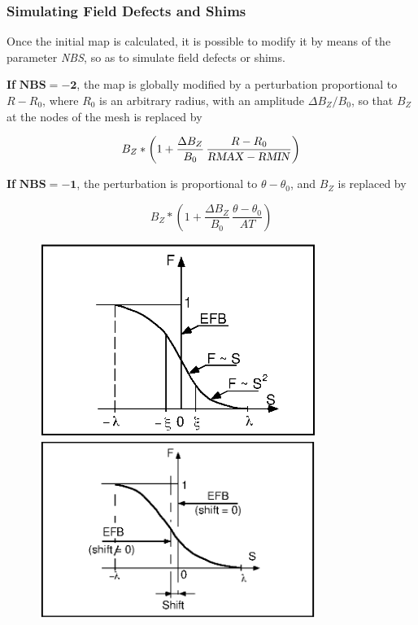  
 \subsubsection*{Simulating Field Defects and Shims } 
 
  Once the initial map is calculated, it is possible to modify it by
means of the parameter \textsl{NBS}, so as to simulate field defects or shims. 
\bigskip

\noindent\textbf{If} $\mathbf{NBS = -2}$, the map is globally modified by a
perturbation proportional to $ R-R_0 $, where $ R_0 $ is an arbitrary radius, 
with an amplitude $ \Delta B_Z/B_0 $, so that $ B_Z $ at the nodes of the mesh is replaced by 

$$ B_Z \ast  \left( 1+ \frac{\Delta B_Z }{ B_0} \,
                 \frac{R-R_0 }{\text{\textsl{RMAX}} - \text{\textsl{RMIN}}} \right) $$


\noindent\textbf{If} $\mathbf{NBS = -1}$, the perturbation is proportional to
$ \theta -\theta_ 0 $, and $ B_Z $ is replaced by 

$$ B_Z \ast  \left(1+ \frac{\Delta B_Z }{ B_0}\, \frac {\theta -\theta_ 0 }{ AT}\right) $$


\newpage

\begin{figure}[H]
  \centering
  \includegraphics[width=9cm]{Fig10.ps}
  \vfill
  \includegraphics[width=9cm]{Fig11.ps}
{\setlength{\captionwidth}{18cm}
}
\end{figure}

